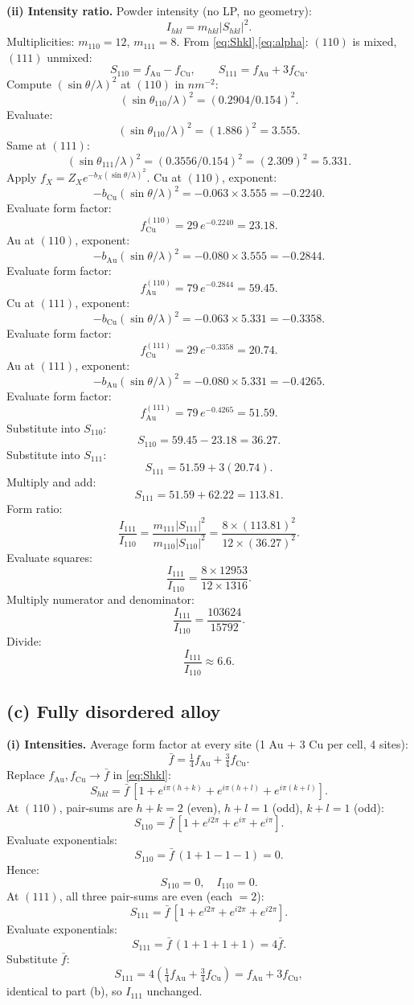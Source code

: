 \documentclass[11pt]{article}
\begin{document}
\textbf{(ii) Intensity ratio.} Powder intensity (no LP, no geometry):
\[ I_{hkl}=m_{hkl}|S_{hkl}|^2. \]
Multiplicities: $m_{110}=12$, $m_{111}=8$. From \eqref{eq:Shkl},\eqref{eq:alpha}: $(110)$ is mixed, $(111)$ unmixed:
\begin{equation}
S_{110}=f_{\text{Au}}-f_{\text{Cu}},\qquad S_{111}=f_{\text{Au}}+3f_{\text{Cu}}.
\label{eq:S110-S111}
\end{equation}
Compute $(\sin\theta/\lambda)^2$ at $(110)$ in $\si{nm^{-2}}$:
\[ (\sin\theta_{110}/\lambda)^2=(0.2904/0.154)^2. \]
Evaluate:
\[ (\sin\theta_{110}/\lambda)^2=(1.886)^2=3.555. \]
Same at $(111)$:
\[ (\sin\theta_{111}/\lambda)^2=(0.3556/0.154)^2=(2.309)^2=5.331. \]
Apply $f_X=Z_X e^{-b_X(\sin\theta/\lambda)^2}$. Cu at $(110)$, exponent:
\[ -b_{\text{Cu}}(\sin\theta/\lambda)^2=-0.063\times 3.555=-0.2240. \]
Evaluate form factor:
\[ f_{\text{Cu}}^{(110)}=29\,e^{-0.2240}=23.18. \]
Au at $(110)$, exponent:
\[ -b_{\text{Au}}(\sin\theta/\lambda)^2=-0.080\times 3.555=-0.2844. \]
Evaluate form factor:
\[ f_{\text{Au}}^{(110)}=79\,e^{-0.2844}=59.45. \]
Cu at $(111)$, exponent:
\[ -b_{\text{Cu}}(\sin\theta/\lambda)^2=-0.063\times 5.331=-0.3358. \]
Evaluate form factor:
\[ f_{\text{Cu}}^{(111)}=29\,e^{-0.3358}=20.74. \]
Au at $(111)$, exponent:
\[ -b_{\text{Au}}(\sin\theta/\lambda)^2=-0.080\times 5.331=-0.4265. \]
Evaluate form factor:
\[ f_{\text{Au}}^{(111)}=79\,e^{-0.4265}=51.59. \]
Substitute into $S_{110}$:
\[ S_{110}=59.45-23.18=36.27. \]
Substitute into $S_{111}$:
\[ S_{111}=51.59+3(20.74). \]
Multiply and add:
\[ S_{111}=51.59+62.22=113.81. \]
Form ratio:
\[ \frac{I_{111}}{I_{110}}=\frac{m_{111}|S_{111}|^2}{m_{110}|S_{110}|^2}=\frac{8\times(113.81)^2}{12\times(36.27)^2}. \]
Evaluate squares:
\[ \frac{I_{111}}{I_{110}}=\frac{8\times 12953}{12\times 1316}. \]
Multiply numerator and denominator:
\[ \frac{I_{111}}{I_{110}}=\frac{103624}{15792}. \]
Divide:
\[ \boxed{\;\frac{I_{111}}{I_{110}}\approx 6.6.\;} \]

\subsection*{(c) Fully disordered alloy}

\textbf{(i) Intensities.} Average form factor at every site (1 Au + 3 Cu per cell, 4 sites):
\[ \bar f=\tfrac14 f_{\text{Au}}+\tfrac34 f_{\text{Cu}}. \]
Replace $f_{\text{Au}},f_{\text{Cu}}\to\bar f$ in \eqref{eq:Shkl}:
\[ S_{hkl}=\bar f\,[1+e^{i\pi(h+k)}+e^{i\pi(h+l)}+e^{i\pi(k+l)}]. \]
At $(110)$, pair-sums are $h+k=2$ (even), $h+l=1$ (odd), $k+l=1$ (odd):
\[ S_{110}=\bar f\,[1+e^{i2\pi}+e^{i\pi}+e^{i\pi}]. \]
Evaluate exponentials:
\[ S_{110}=\bar f\,(1+1-1-1)=0. \]
Hence:
\[ \boxed{\;S_{110}=0,\quad I_{110}=0.\;} \]
At $(111)$, all three pair-sums are even (each $=2$):
\[ S_{111}=\bar f\,[1+e^{i2\pi}+e^{i2\pi}+e^{i2\pi}]. \]
Evaluate exponentials:
\[ S_{111}=\bar f\,(1+1+1+1)=4\bar f. \]
Substitute $\bar f$:
\[ S_{111}=4\!\left(\tfrac14 f_{\text{Au}}+\tfrac34 f_{\text{Cu}}\right)=f_{\text{Au}}+3f_{\text{Cu}}, \]
identical to part (b), so $I_{111}$ unchanged.
\end{document}
